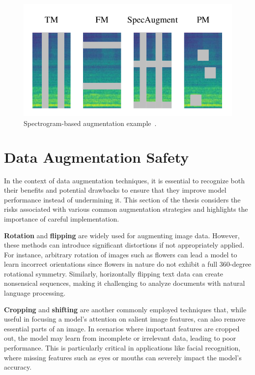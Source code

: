 \begin{figure}[!htb]
    \centering
    \includegraphics[scale=0.8]{Images/spectrogram-masking.png}
    \caption{Spectrogram-based augmentation example~\cite{MaskingAugmentation}.}
    \label{fig:specAudioAugmentation}
\end{figure}

\section{Data Augmentation Safety}

In the context of data augmentation techniques, it is essential to recognize both their benefits and potential drawbacks to ensure that they improve model performance instead of undermining it. This section of the thesis considers the risks associated with various common augmentation strategies and highlights the importance of careful implementation.

\textbf{Rotation} and \textbf{flipping} are widely used for augmenting image data. However, these methods can introduce significant distortions if not appropriately applied. For instance, arbitrary rotation of images such as flowers can lead a model to learn incorrect orientations since flowers in nature do not exhibit a full 360-degree rotational symmetry. Similarly, horizontally flipping text data can create nonsensical sequences, making it challenging to analyze documents with natural language processing.

\textbf{Cropping} and \textbf{shifting} are another commonly employed techniques that, while useful in focusing a model's attention on salient image features, can also remove essential parts of an image. In scenarios where important features are cropped out, the model may learn from incomplete or irrelevant data, leading to poor performance. This is particularly critical in applications like facial recognition, where missing features such as eyes or mouths can severely impact the model's accuracy.

